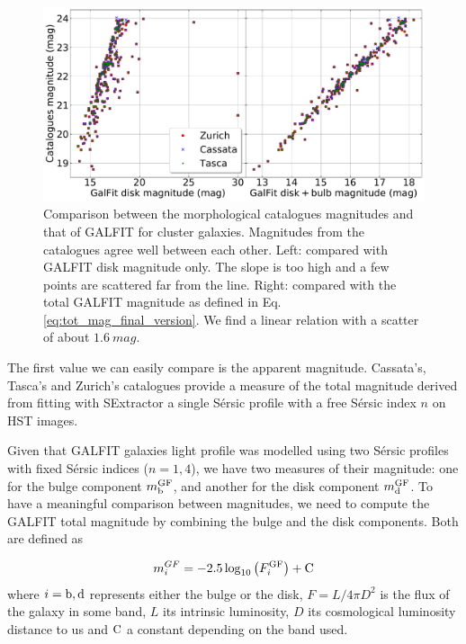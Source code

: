 \begin{figure}[htbp]
	\includegraphics[width=\linewidth]{../Plots/catalogMag_against_GalfitMag_corrected.pdf}
	\caption[Comparison between magnitudes]{Comparison between the morphological catalogues magnitudes and that of GALFIT for cluster galaxies. Magnitudes from the catalogues agree well between each other. Left: compared with GALFIT disk magnitude only. The slope is too high and a few points are scattered far from the line. Right: compared with the total GALFIT magnitude as defined in Eq.\,\ref{eq:tot_mag_final_version}. We find a linear relation with a scatter of about $\SI{1.6}{mag}$.}
	\label{fig:comp_mags}
\end{figure}

The first value we can easily compare is the apparent magnitude. Cassata's, Tasca's and Zurich's catalogues provide a measure of the total magnitude derived from fitting with SExtractor a single Sérsic profile with a free Sérsic index $n$ on HST images.

Given that GALFIT galaxies light profile was modelled using two Sérsic profiles with fixed Sérsic indices ($n = 1, 4$), we have two measures of their magnitude: one for the bulge component $m_{\rm{b}}^{\rm{GF}}$, and another for the disk component $m_{\rm{d}}^{\rm{GF}}$. To have a meaningful comparison between magnitudes, we need to compute the GALFIT total magnitude by combining the bulge and the disk components. Both are defined as

\begin{equation}
	m_i^{GF} = -2.5 \log_{10} \left ( F_i^{\rm{GF}} \right ) + \rm{C}
	\label{eq:disk_bulge_lum}
\end{equation}
 where $i = \rm{b, d}$ represents either the bulge or the disk, $F = L/{4 \pi D^2}$ is the flux of the galaxy in some band, $L$ its intrinsic luminosity, $D$ its cosmological luminosity distance to us and $\rm{C}$ a constant depending on the band used.

